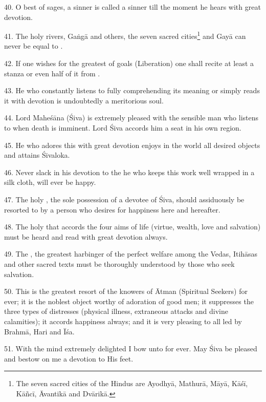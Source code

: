 40. O best of sages, a sinner is called a sinner till the moment he hears
 with great devotion.

41. The holy rivers, Gaṅgā and others, the seven sacred cities\footnote{The seven
sacred cities of the Hindus are Ayodhyā, Mathurā, Māyā, Kāśī, Kāñcī, Āvantikā
and Dvārikā.} and Gayā can never be equal to .

42. If one wishes for the greatest of goals (Liberation) one shall recite at
least a stanza or even half of it from .

43. He who constantly listens to  fully comprehending its meaning
or simply reads it with devotion is undoubtedly a meritorious soul.

44. Lord Maheśāna (Śiva) is extremely pleased with the sensible man who listens
to  when death is imminent. Lord Śiva accords him a seat in his
own region.

45. He who adores this  with great devotion enjoys in the world
all desired objects and attains Śivaloka.

46. Never slack in his devotion to the  he who keeps this work
well wrapped in a silk cloth, will ever be happy.

47. The holy , the sole possession of a devotee of Śiva, should
assiduously be resorted to by a person who desires for happiness here and
hereafter.

48. The holy  that accords the four aims of life (virtue, wealth,
love and salvation) must be heard and read with great devotion always.

49. The , the greatest harbinger of the perfect welfare among the
Vedas, Itihāsas and other sacred texts must be thoroughly understood by those
who seek salvation.

50. This  is the greatest resort of the knowers of Ātman
(Spiritual Seekers) for ever; it is the noblest object worthy of adoration of
good men; it suppresses the three types of distresses (\ie physical illness,
extraneous attacks and divine calamities); it accords happiness always; and it
is very pleasing to all  led by Brahmā, Hari and Īśa.

51. With the mind extremely delighted I bow unto  for ever. May
Śiva be pleased and bestow on me a devotion to His feet.
